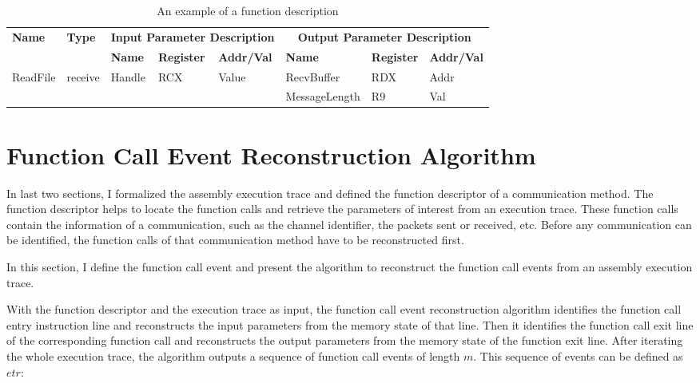 \begin{table}[H]
        \centering
        \caption{An example of a function description}
        \label{functionexample}
        \begin{tabular}{|l|l|l|l|l|l|l|l|}
            \hline
             \multirow{2}{*}{{\textbf{Name}}} & \multirow{2}{*}{{\textbf{Type}}} & \multicolumn{3}{c|}{\textbf{Input Parameter Description}} & \multicolumn{3}{c|}{\textbf{Output Parameter Description}} \\
              \cline{3-8} 
             & & \textbf{Name}& \textbf{Register} &  \textbf{Addr/Val} & \textbf{Name}& \textbf{Register} &  \textbf{Addr/Val}  \\
             \hline
             \multirow{2}{*}{ReadFile}
             &\multirow{2}{*}{receive} &  \multirow{2}{*}{Handle} & \multirow{2}{*}{RCX} & \multirow{2}{*}{Value} & RecvBuffer & RDX  & Addr\\
              \cline{6-8} 
             & & & & & MessageLength & R9  & Val\\
            \hline            
        \end{tabular}
    \end{table}

\section{Function Call Event Reconstruction Algorithm}
In last two sections, I formalized the assembly execution trace and defined the function descriptor of a communication method. The function descriptor helps to locate the function calls and retrieve the parameters of interest from an execution trace. These function calls contain the information of a communication, such as the channel identifier, the packets sent or received, etc. Before any communication can be identified, the function calls of that communication method have to be reconstructed first. 

In this section, I define the function call event and present the algorithm to reconstruct the function call events from an assembly execution trace. 

With the function descriptor and the execution trace as input, the function call event reconstruction algorithm identifies the function call entry instruction line and reconstructs the input parameters from the memory state of that line. Then it identifies the function call exit line of the corresponding function call and reconstructs the output parameters from the memory state of the function exit line. After iterating the whole execution trace, the algorithm outputs a sequence of function call events of length $m$. This sequence of events can be defined as $etr$:

